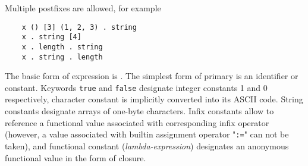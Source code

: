 Multiple postfixes are allowed, for example

\begin{lstlisting}
    x () [3] (1, 2, 3) . string
    x . string [4]
    x . length . string
    x . string . length
\end{lstlisting}

The basic form of expression is . The simplest form of primary is an identifier or constant. Keywords \lstinline|true| and \lstinline|false|
designate integer constants 1 and 0 respectively, character constant is implicitly converted into its ASCII code.  String constants designate arrays
of one-byte characters. Infix constants allow to reference a functional value associated with corresponding infix operator (however, a value associated with
builtin assignment operator "\lstinline|:=|" can not be taken), and functional constant (\emph{lambda-expression})
designates an anonymous functional value in the form of closure. 

